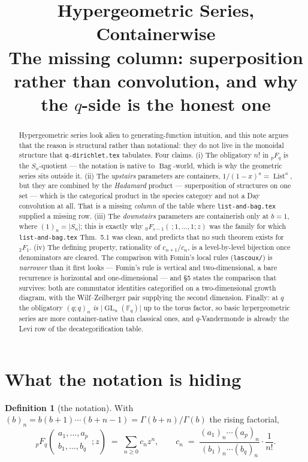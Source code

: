 \documentclass[11pt,a4paper]{article}
\title{\bfseries Hypergeometric Series, Containerwise\\[0.4em]
\large The missing column: superposition rather than convolution,
and why the $q$-side is the honest one}
\author{}
\date{}
\theoremstyle{definition}
\newtheorem{definition}[theorem]{Definition}
\theoremstyle{remark}
\newcommand{\FF}{\mathbb{F}}
\newcommand{\norm}[1]{\lvert #1 \rvert}
\DeclareMathOperator{\GL}{GL}
\DeclareMathOperator{\List}{List}
\DeclareMathOperator{\Bag}{Bag}
\begin{document}
\maketitle

\begin{abstract}
Hypergeometric series look alien to generating-function intuition, and this note
argues that the reason is structural rather than notational: they do not live in the
monoidal structure that \texttt{q-dirichlet.tex} tabulates. Four claims. (i) The
obligatory $n!$ in ${}_pF_q$ is the $S_n$-quotient --- the notation is native to
$\Bag$-world, which is why the geometric series sits outside it. (ii) The
\emph{upstairs} parameters are containers, $1/(1-x)^a = \List^a$, but they are
combined by the \emph{Hadamard} product --- superposition of structures on one set
--- which is the categorical product in the species category and not a Day
convolution at all. That is a missing \emph{column} of the table where
\texttt{list-and-bag.tex} supplied a missing row. (iii) The \emph{downstairs}
parameters are containerish only at $b = 1$, where $(1)_n = \norm{S_n}$; this is
exactly why ${}_0F_{s-1}(\,;1,\dots,1;z)$ was the family for which
\texttt{list-and-bag.tex} Thm.~5.1 was clean, and predicts that no such theorem
exists for ${}_2F_1$. (iv) The defining property, rationality of $c_{n+1}/c_n$, is a
level-by-level bijection once denominators are cleared. The comparison with Fomin's
local rules (\texttt{lascoux/}) is \emph{narrower} than it first looks --- Fomin's
rule is vertical and two-dimensional, a bare recurrence is horizontal and
one-dimensional --- and \S5 states the comparison that survives: both are
commutator identities categorified on a two-dimensional growth diagram, with the
Wilf--Zeilberger pair supplying the second dimension. Finally: at $q$ the obligatory $(q;q)_n$ \emph{is}
$\norm{\GL_n(\FF_q)}$ up to the torus factor, so basic hypergeometric series are more
container-native than classical ones, and $q$-Vandermonde is already the Levi row of
the decategorification table.
\end{abstract}

\section{What the notation is hiding}

\begin{definition}[the notation]\label{def:pFq}
With $(b)_n = b(b+1)\cdots(b+n-1) = \Gamma(b+n)/\Gamma(b)$ the rising factorial,
\[
  {}_pF_q\!\left(\begin{matrix} a_1,\dots,a_p \\ b_1,\dots,b_q\end{matrix}; z\right)
  \;=\; \sum_{n \ge 0} c_n z^n,
  \qquad
  c_n \;=\; \frac{(a_1)_n \cdots (a_p)_n}{(b_1)_n\cdots(b_q)_n}\cdot\frac{1}{n!} .
\]
\end{definition}
\end{document}
